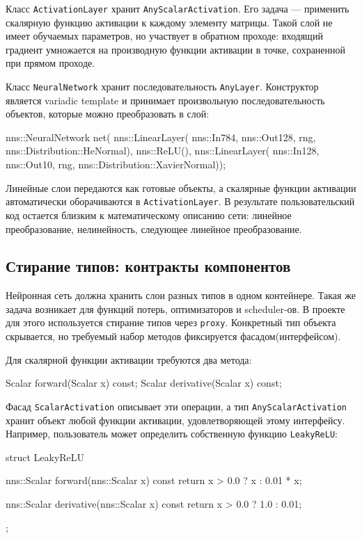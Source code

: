 \documentclass{article}
\begin{document}
Класс \texttt{ActivationLayer} хранит \texttt{AnyScalarActivation}.
Его задача --- применить скалярную функцию активации к каждому
элементу матрицы. Такой слой не имеет обучаемых параметров, но
участвует в обратном проходе: входящий градиент умножается на
производную функции активации в точке, сохраненной при прямом проходе.

Класс \texttt{NeuralNetwork} хранит последовательность
\texttt{AnyLayer}. Конструктор является variadic template и
принимает произвольную последовательность объектов, которые можно
преобразовать в слой:
\begin{cppcode}
nns::NeuralNetwork net(
    nns::LinearLayer(
        nns::In{784},
        nns::Out{128},
        rng,
        nns::Distribution::HeNormal),
    nns::ReLU(),
    nns::LinearLayer(
        nns::In{128},
        nns::Out{10},
        rng,
        nns::Distribution::XavierNormal));
\end{cppcode}
Линейные слои передаются как готовые объекты, а скалярные функции
активации автоматически оборачиваются в \texttt{ActivationLayer}. В
результате пользовательский код остается близким к математическому
описанию сети: линейное преобразование, нелинейность, следующее
линейное преобразование.

\subsection{Стирание типов: контракты компонентов}

Нейронная сеть должна хранить слои разных типов в одном контейнере.
Такая же задача возникает для функций потерь, оптимизаторов и
scheduler-ов. В проекте для этого используется стирание типов через
\texttt{proxy}. Конкретный тип объекта скрывается, но требуемый набор
методов фиксируется фасадом(интерфейсом).

Для скалярной функции активации требуются два метода:
\begin{cppcode}
Scalar forward(Scalar x) const;
Scalar derivative(Scalar x) const;
\end{cppcode}
Фасад \texttt{ScalarActivation} описывает эти операции, а тип
\texttt{AnyScalarActivation} хранит объект любой функции активации,
удовлетворяющей этому интерфейсу. Например, пользователь может
определить собственную функцию \texttt{LeakyReLU}:
\begin{cppcode}
struct LeakyReLU {
    nns::Scalar forward(nns::Scalar x) const {
        return x > 0.0 ? x : 0.01 * x;
    }

    nns::Scalar derivative(nns::Scalar x) const {
        return x > 0.0 ? 1.0 : 0.01;
    }
};
\end{cppcode}
\end{document}

